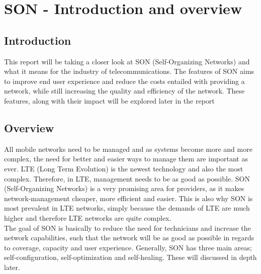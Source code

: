 \documentclass{report}
\begin{document}
\newpage
\tableofcontents
\newpage


\chapter{SON - Introduction and overview}
\section{Introduction}
This report will be taking a closer look at SON (Self-Organizing Networks) and what it means for the industry of telecommunications. 
The features of SON aims to improve end user experience and reduce the costs entailed with providing a network, while still increasing the quality and efficiency of the network. 
These features, along with their impact will be explored later in the report 

\section{Overview}
All mobile networks need to be managed and as systems become more and more complex, the need for better and easier ways to manage them are important as ever. LTE (Long Term Evolution) is the newest technology and also the most complex. Therefore, in LTE, management needs to be as good as possible. SON (Self-Organizing Networks) is a very promising area for providers, as it makes network-management cheaper, more efficient and easier. This is also why SON is most prevalent in LTE networks, simply because the demands of LTE are much higher and therefore LTE networks are quite complex.\\ The goal of SON is basically to reduce the need for technicians and increase the network capabilities, such that the network will be as good as possible in regards to coverage, capacity and user experience. Generally, SON has three main areas; self-configuration, self-optimization and self-healing. These will discussed in depth later. 
\end{document}
